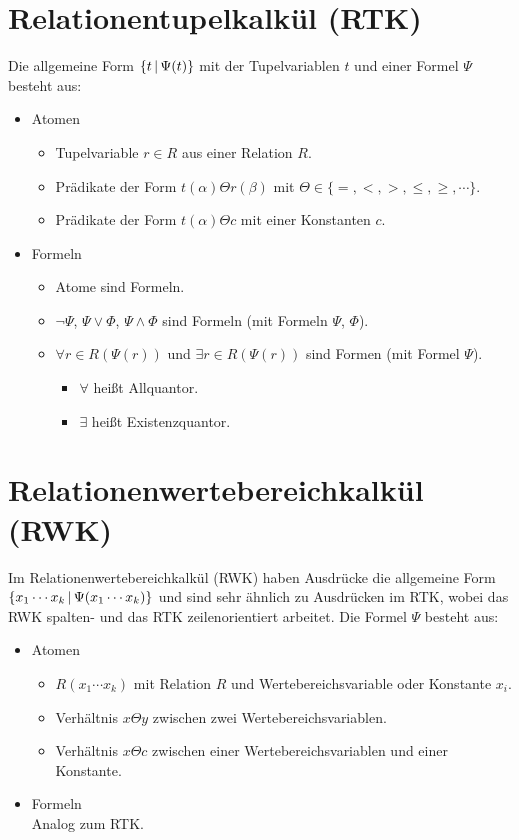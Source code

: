 	\section{Relationentupelkalkül (RTK)} %
		Die allgemeine Form \( \{ t \,\vert\, \Psi(t) \} \) mit der Tupelvariablen \(t\) und einer Formel \(\Psi\) besteht aus:
		\begin{itemize}
			\item Atomen
				\begin{itemize}
					\item Tupelvariable \( r \in R \) aus einer Relation \(R\).
					\item Prädikate der Form \( t(\alpha) \Theta r(\beta) \) mit \( \Theta \in \{ =, <, >, \leq, \geq, \cdots \} \).
					\item Prädikate der Form \( t(\alpha) \Theta c \) mit einer Konstanten \(c\).
				\end{itemize}
			\item Formeln
				\begin{itemize}
					\item Atome sind Formeln.
					\item \( \lnot\Psi \), \( \Psi \lor \Phi \), \( \Psi \land \Phi \) sind Formeln (mit Formeln \(\Psi\), \(\Phi\)).
					\item \( \forall r \in R (\Psi(r)) \) und \( \exists r \in R (\Psi(r)) \) sind Formen (mit Formel \(\Psi\)).
						\begin{itemize}
							\item \( \forall \) heißt Allquantor.
							\item \( \exists \) heißt Existenzquantor.
						\end{itemize}
				\end{itemize}
		\end{itemize}

	\section{Relationenwertebereichkalkül (RWK)} %
		Im Relationenwertebereichkalkül (RWK) haben Ausdrücke die allgemeine Form \( \{ x_1 \cdots x_k \,\vert\, \Psi(x_1 \cdots x_k) \} \) und sind sehr ähnlich zu Ausdrücken im RTK, wobei das RWK spalten- und das RTK zeilenorientiert arbeitet. Die Formel \(\Psi\) besteht aus:
		\begin{itemize}
			\item Atomen
				\begin{itemize}
					\item \(R(x_1 \cdots x_k)\) mit Relation \(R\) und Wertebereichsvariable oder Konstante \(x_i\).
					\item Verhältnis \( x \Theta y \) zwischen zwei Wertebereichsvariablen.
					\item Verhältnis \( x \Theta c \) zwischen einer Wertebereichsvariablen und einer Konstante.
				\end{itemize}
			\item Formeln \\ Analog zum RTK.
		\end{itemize}

